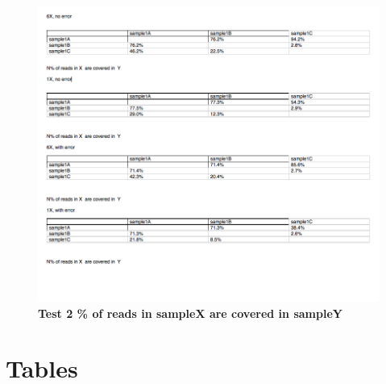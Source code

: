 \documentclass[10pt]{article}
\begin{document}
\begin{figure}[!ht]
\centerline{\includegraphics[width=8in]{./figure/figure2}}
\caption{\bf Test 2 \% of reads in sampleX are covered in sampleY }
\label{fig:figure2}
\end{figure}


\section*{Tables}

%
\end{document}
